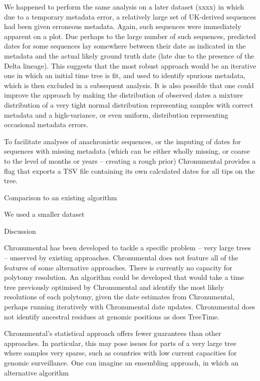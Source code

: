 We happened to perform the same analysis on a later dataset (xxxx) in which due to a temporary metadata error, a relatively large set of UK-derived sequences had been given erroneous metadata. Again, such sequences were immediately apparent on a plot. Due perhaps to the large number of such sequences, predicted dates for some sequences lay somewhere between their date as indicated in the metadata and the actual likely ground truth date (late due to the presence of the Delta lineage). This suggests that the most robust approach would be an iterative one in which an initial time tree is fit, and used to identify  spurious metadata, which is then excluded in a subsequent analysis. It is also possible that one could improve the approach by making the distribution of observed dates a mixture distribution of a very tight normal distribution representing samples with correct metadata and a high-variance, or even uniform, distribution representing occasional metadata errors.

To facilitate analyses of anachronistic sequences, or the imputing of dates for sequences with missing metadata (which can be either wholly missing, or coarse to the level of months or years -- creating a rough prior) Chronumental provides a flag that exports a TSV file containing its own calculated dates for all tips on the tree.

Comparison to an existing algorithm

We used a smaller dataset


Discussion


Chronumental has been developed to tackle a specific problem -- very large trees -- unserved by existing approaches. Chronumental does not feature all of the features of some alternative approaches. There is currently no capacity for polytomy resolution. An algorithm could be developed that would take a time tree previously optimised by Chronumental and identify the most likely resolutions of each polytomy, given the date estimates from Chronumental, perhaps running iteratively with Chronumental date updates. Chronumental does not identify ancestral residues at genomic positions as does TreeTime. 

Chronumental's statistical approach offers fewer guarantees than other approaches. In particular, this may pose issues for parts of a very large tree where samples very sparse, such as countries with low current capacities for genomic surveillance. One can imagine an ensembling approach, in which an alternative algorithm

